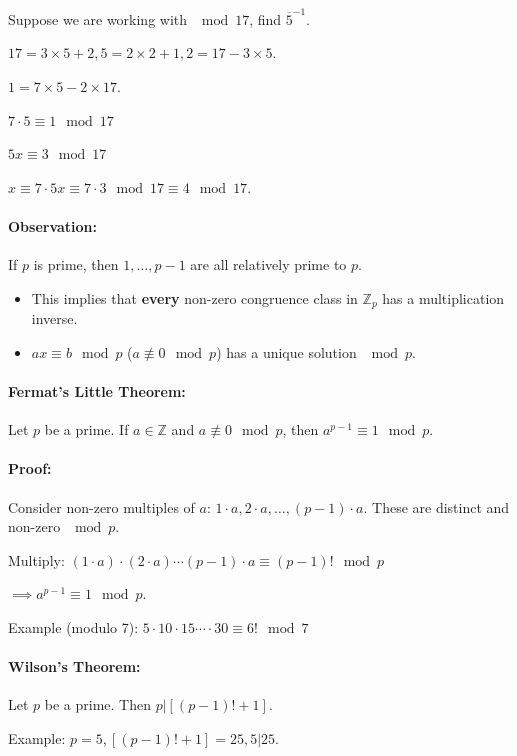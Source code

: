 \documentclass[a4paper, 11pt, twoside]{article}
\begin{document}
 Suppose we are working with $\mod 17$, find $\overline{5}^{-1}$.
 
 $17=3\times 5+2, 5=2\times 2+1, 2=17-3\times 5.$
 
 $1=7\times 5-2\times 17$.
 
 $7\cdot 5\equiv 1\mod 17$
 
 $5x\equiv 3\mod 17$
 
 $x\equiv 7\cdot 5x\equiv 7\cdot 3\mod 17\equiv 4\mod 17.$\\
 
 \paragraph{Observation:} If $p$ is prime, then $1,\dots, p-1$ are all relatively prime to $p$.
 
\begin{itemize}
	\item This implies that \textbf{every} non-zero congruence class in $\mathbb{Z}_p$ has a multiplication inverse.
	\item $ax\equiv b\mod p$ ($a\not\equiv 0\mod p$) has a unique solution $\mod p$.
\end{itemize}

\paragraph{Fermat's Little Theorem:} Let $p$ be a prime. If $a\in\mathbb{Z}$ and $a\not\equiv 0\mod p$, then $a^{p-1}\equiv 1 \mod p$.

\paragraph{Proof:} Consider non-zero multiples of $a$: $1\cdot a, 2\cdot a, \dots, (p-1)\cdot a$. These are distinct and non-zero $\mod p$.

Multiply: $(1\cdot a)\cdot (2\cdot a)\cdots (p-1)\cdot a\equiv (p-1)!\mod p$

$\implies a^{p-1}\equiv 1 \mod p$.

Example (modulo 7): $5\cdot 10\cdot 15\cdots \cdot 30\equiv 6!\mod 7 $

\paragraph{Wilson's Theorem:} Let $p$ be a prime. Then $p|[(p-1)!+1]$.

Example: $p=5, [(p-1)!+1] = 25, 5|25.$
\end{document}
